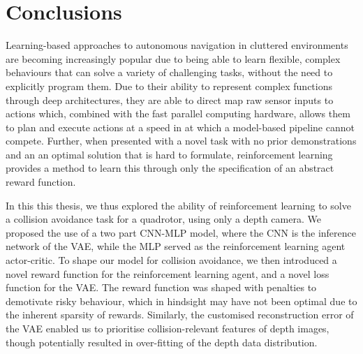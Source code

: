 \chapter{Conclusions}
\label{chap:10_conclusions}
\begin{comment}
A concise summary of essential information and findings in the project.
\end{comment}

Learning-based approaches to autonomous navigation in cluttered environments are becoming increasingly popular due to being able to learn flexible, complex behaviours that can solve a variety of challenging tasks, without the need to explicitly program them. Due to their ability to represent complex functions through deep architectures, they are able to direct map raw sensor inputs to actions which, combined with the fast parallel computing hardware, allows them to plan and execute actions at a speed in at which a model-based pipeline cannot compete.
Further, when presented with a novel task with no prior demonstrations and an an optimal solution that is hard to formulate, reinforcement learning provides a method to learn this through only the specification of an abstract reward function.

In this this thesis, we thus explored the ability of reinforcement learning to solve a collision avoidance task for a quadrotor, using only a depth camera. We proposed the use of a two part CNN-MLP model, where the CNN is the inference network of the VAE, while the MLP served as the reinforcement learning agent actor-critic. To shape our model for collision avoidance, we then introduced a novel reward function for the reinforcement learning agent, and a novel loss function for the VAE. The reward function was shaped with penalties to demotivate risky behaviour, which in hindsight may have not been optimal due to the inherent sparsity of rewards. Similarly, the customised reconstruction error of the VAE enabled us to prioritise collision-relevant features of depth images, though potentially resulted in over-fitting of the depth data distribution.


